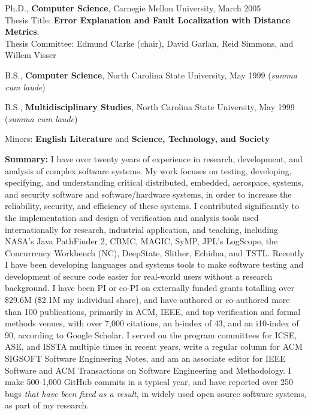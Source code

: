 \documentclass[ComputerScience]{vita}
\begin{document}
\begin{vita}


\begin{Education}
  \item Ph.D., {\bf Computer Science}, Carnegie Mellon University, March 2005\\ Thesis Title:  {\bf Error Explanation and Fault Localization with Distance Metrics}.\\Thesis Committee:  Edmund Clarke (chair), David Garlan, Reid Simmons, and Willem Visser

  \item B.S., {\bf Computer Science}, North Carolina State University, May 1999 (\emph{summa cum laude})
  \item B.S., {\bf Multidisciplinary Studies}, North Carolina State University, May 1999 (\emph{summa cum laude})
\item  \hspace{0.5in} Minors:  {\bf English Literature} and {\bf Science, Technology, and Society}
\end{Education}

\begin{Experience}
\item {\bf Summary:} I have over twenty years of experience in
  research, development, and analysis of complex software systems.  My
  work focuses on testing, developing, specifying, and understanding
  critical distributed, embedded, aerospace, systems, and security
  software and software/hardware systems, in order to increase the
  reliability, security, and efficiency of these systems.  I
  contributed significantly to the implementation and design of
  verification and analysis tools used internationally for research,
  industrial application, and teaching, including NASA's Java
  PathFinder 2, CBMC, MAGIC, SyMP, JPL's LogScope, the Concurrency
  Workbench (NC), DeepState, Slither, Echidna, and TSTL.  Recently I have been developing languages
  and systems tools to make software testing and development of secure
  code easier for real-world users without a research background.
  I have been PI or co-PI on externally funded grants totalling over
  \$29.6M (\$2.1M my individual share), and have authored or co-authored more than
  100 publications, primarily in ACM, IEEE, and top verification and
  formal methods venues, with over 7,000 citations, an h-index of 43,
  and an i10-index of 90, according to Google Scholar.  I served on
  the program committees for ICSE, ASE, and ISSTA multiple times in
  recent years, write a regular column for ACM SIGSOFT Software
  Engineering Notes, and am an associate editor for IEEE Software and ACM Transactions on Software Engineering and Methodology.  I make 500-1,000 GitHub commits in a typical
  year, and have reported over 250 bugs \emph{that have been fixed as a result}, in widely used open source
  software systems, as part of my research.



\end{Experience}
\end{vita}
\end{document}
